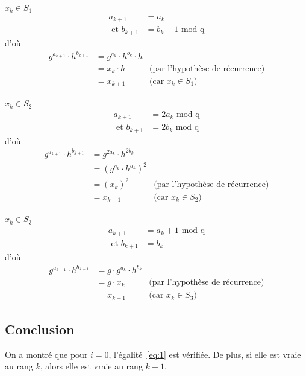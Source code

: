         \underline{$x_{k} \in S_1$}
        \begin{align*}
          a_{k+1} &= a_k \\
          \text{\ et } b_{k+1} &= b_k + 1 \text{\ mod q}
        \end{align*}
        d'où
        \begin{align*}
          g^{a_{k+1}} \cdot h^{b_{k+1}} &= g^{a_k} \cdot h^{b_k} \cdot h \\
                                        &= x_k \cdot h & \text{(par l'hypothèse de récurrence)} \\
                                        &= x_{k+1} & \text{(car $x_k \in S_1$)}
        \end{align*}


        \underline{$x_{k} \in S_2$}
        \begin{align*}
          a_{k+1} &= 2a_k \text{\ mod q}\\
          \text{\ et } b_{k+1} &= 2b_k \text{\ mod q}
        \end{align*}
        d'où
        \begin{align*}
          g^{a_{k+1}} \cdot h^{b_{k+1}} &= g^{2a_k} \cdot h^{2b_k} \\
                                        &= {(g^{a_k} \cdot h^{a_k})}^2 \\
                                        &= {(x_k)}^2 & \text{(par l'hypothèse de récurrence)} \\
                                        &= x_{k+1} & \text{(car $x_k \in S_2$)}
        \end{align*}

        \underline{$x_{k} \in S_3$}
        \begin{align*}
          a_{k+1} &= a_k + 1 \text{\ mod q} \\
          \text{\ et } b_{k+1} &= b_k
        \end{align*}
        d'où
        \begin{align*}
          g^{a_{k+1}} \cdot h^{b_{k+1}} &= g \cdot g^{a_k} \cdot h^{b_k} \\
                                        &= g \cdot x_k & \text{(par l'hypothèse de récurrence)} \\
                                        &= x_{k+1} & \text{(car $x_k \in S_3$)}
        \end{align*}


        \subsection*{Conclusion}
        On a montré que pour $i = 0$, l'égalité~\ref{eq:1} est vérifiée.
        De plus, si elle est vraie au rang $k$, alors elle est vraie au rang $k+1$.

